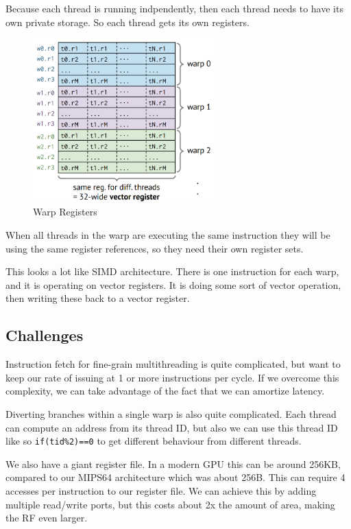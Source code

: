 \documentclass{article}
\begin{document}
Because each thread is running indpendently, then each thread needs to have its own private storage. So each thread gets its own registers. 

 \begin{figure}[ht!]
\centering
\includegraphics[width=70mm]{img/warpreg.png}
\caption{Warp Registers}
\end{figure}

When all threads in the warp are executing the same instruction they will be using the same register references, so they need their own register sets. 

This looks a lot like SIMD architecture. There is one instruction for each warp, and it is operating on vector registers. It is doing some sort of vector operation, then writing these back to a vector register. 


\subsection{Challenges}

Instruction fetch for fine-grain multithreading is quite complicated, but want to keep our rate of issuing at 1 or more instructions per cycle. If we overcome this complexity, we can take advantage of the fact that we can amortize latency. 

Diverting branches within a single warp is also quite complicated. Each thread can compute an address from its thread ID, but also we can use this thread ID like so \texttt{if(tid\%2)==0} to get different behaviour from different threads. 

We also have a giant register file. In a modern GPU this can be around 256KB, compared to our MIPS64 architecture which was about 256B. This can require 4 accesses per instruction to our register file. We can achieve this by adding multiple read/write ports, but this costs about 2x the amount of area, making the RF even larger. 
\end{document}
